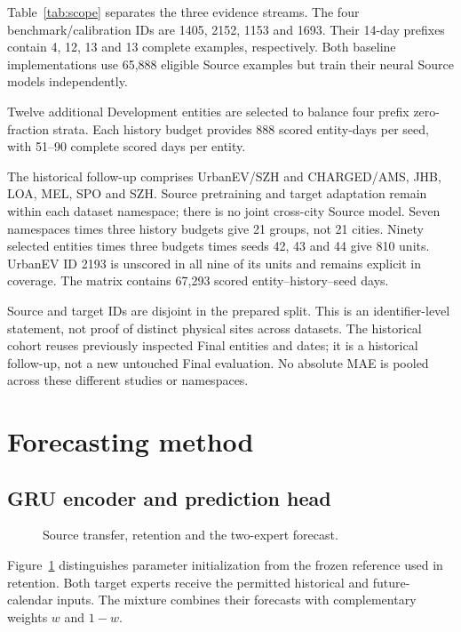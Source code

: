 \documentclass[pdflatex,iicol,sn-mathphys-num]{sn-jnl}
\begin{document}
Table~\ref{tab:scope} separates the three evidence streams. The four benchmark/calibration IDs are 1405, 2152, 1153 and 1693. Their 14-day prefixes contain 4, 12, 13 and 13 complete examples, respectively. Both baseline implementations use 65,888 eligible Source examples but train their neural Source models independently.

Twelve additional Development entities are selected to balance four prefix zero-fraction strata. Each history budget provides 888 scored entity-days per seed, with 51--90 complete scored days per entity.

The historical follow-up comprises UrbanEV/SZH and CHARGED/AMS, JHB, LOA, MEL, SPO and SZH. Source pretraining and target adaptation remain within each dataset namespace; there is no joint cross-city Source model. Seven namespaces times three history budgets give 21 groups, not 21 cities. Ninety selected entities times three budgets times seeds 42, 43 and 44 give 810 units. UrbanEV ID 2193 is unscored in all nine of its units and remains explicit in coverage. The matrix contains 67,293 scored entity--history--seed days.

Source and target IDs are disjoint in the prepared split. This is an identifier-level statement, not proof of distinct physical sites across datasets. The historical cohort reuses previously inspected Final entities and dates; it is a historical follow-up, not a new untouched Final evaluation. No absolute MAE is pooled across these different studies or namespaces.

\section{Forecasting method}
\subsection{GRU encoder and prediction head}
\begin{figure}[t]
\centering

\caption{Source transfer, retention and the two-expert forecast.}\label{fig:model}
\end{figure}

Figure~\ref{fig:model} distinguishes parameter initialization from the frozen reference used in retention. Both target experts receive the permitted historical and future-calendar inputs. The mixture combines their forecasts with complementary weights $w$ and $1-w$.
\end{document}
